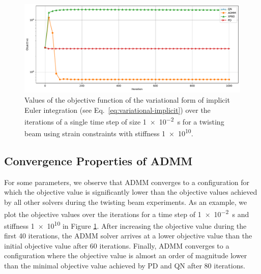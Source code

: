 \begin{figure}[h]
    \includegraphics[width=\textwidth]{figures/strain_beam_twist_objectives.pdf}
    \caption{Values of the objective function of the variational form of implicit Euler integration (see Eq.\ \ref{eq:variational-implicit}) over the iterations of 
        a single time step of size \SI{1e-2}{\second} for a twisting beam using strain constraints with stiffness \num{1e10}.}
    \label{fig:strain-beam-twist-objectives}
\end{figure}

\subsection{Convergence Properties of ADMM}\label{ss:twisting-beam-admm}
For some parameters, we observe that ADMM converges to a configuration for which the objective value is significantly lower than the objective values 
achieved by all other solvers during the twisting beam experiments. As an example, we plot the objective values over the iterations for a time step of 
\SI{1e-2}{\second} and stiffness \num{1e10} in Figure \ref{fig:strain-beam-twist-objectives}. After increasing the objective value during the first 40 
iterations, the ADMM solver arrives at a lower objective value than the initial objective value after 60 iterations. Finally, ADMM 
converges to a configuration where the objective value is almost an order of magnitude lower than the minimal objective value achieved by PD and QN after 
80 iterations.

